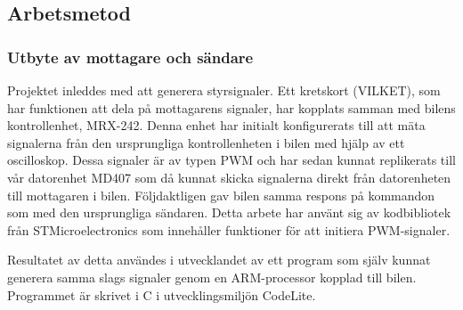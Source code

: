 \documentclass[a4paper]{article}
\begin{document}

\subsection{Arbetsmetod}
\subsubsection{Utbyte av mottagare och sändare}
Projektet inleddes med att generera styrsignaler. Ett kretskort (VILKET), som har funktionen att dela på mottagarens signaler, har kopplats samman med bilens kontrollenhet, MRX-242. Denna enhet har initialt konfigurerats till att mäta signalerna från den ursprungliga kontrollenheten i bilen med hjälp av ett oscilloskop. Dessa signaler är av typen PWM och har sedan kunnat replikerats till vår datorenhet MD407 som då kunnat skicka signalerna direkt från datorenheten till mottagaren i bilen. Följdaktligen gav bilen samma respons på kommandon som med den ursprungliga sändaren. Detta arbete har använt sig av kodbibliotek från STMicroelectronics som innehåller funktioner för att initiera PWM-signaler. 


\vspace{5mm} \noindent
Resultatet av detta användes i utvecklandet av ett program som själv kunnat generera samma slags signaler genom en ARM-processor kopplad till bilen. Programmet är skrivet i C i utvecklingsmiljön CodeLite.

\end{document}
